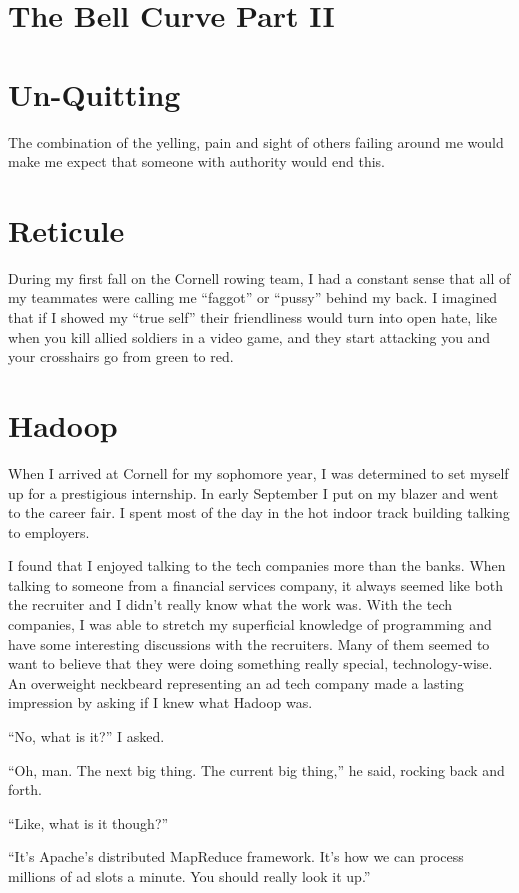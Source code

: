 \documentclass[12pt]{article}
\begin{document}
\section{The Bell Curve Part II}


\section{Un-Quitting}
The combination of the yelling, pain and sight of others failing around me would
make me expect that someone with authority would end this.


\section{Reticule}
During my first fall on the Cornell rowing team, I had a constant sense that
all of my teammates were calling me ``faggot'' or ``pussy'' behind my back.  I
imagined that if I showed my ``true self'' their friendliness would turn into
open hate, like when you kill allied soldiers in a video game, and they start
attacking you and your crosshairs go from green to red.  


\section{Hadoop}
When I arrived at Cornell for my sophomore year, I was determined to set myself
up for a prestigious internship.  In early September I put on my blazer and went
to the career fair.  I spent most of the day in the hot indoor track building
talking to employers. 

I found that I enjoyed talking to the tech companies more than the banks.  When
talking to someone from a financial services company, it always seemed like both
the recruiter and I didn't really know what the work was.  With the tech
companies, I was able to stretch my superficial knowledge of programming and
have some interesting discussions with the recruiters.  Many of them seemed to
want to believe that they were doing something really special, technology-wise.
An overweight neckbeard representing an ad tech company made a lasting impression 
by asking if I knew what Hadoop was.  

``No, what is it?'' I asked.

``Oh, man.  The next big thing.  The current big thing,'' he said,
rocking back and forth.

``Like, what is it though?''

``It's Apache's distributed MapReduce framework.  It's how we can process
millions of ad slots a minute.  You should really look it up.''
\end{document}
